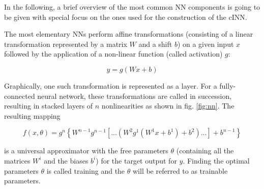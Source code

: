 In the following, a brief overview of the most common NN components is going to be given with special focus on the ones used for the construction of the cINN.

The most elementary NNs perform affine transformations (consisting of a linear transformation represented by a matrix $W$ and a shift $b$) on a given input $x$ followed by the application of a non-linear function (called activation) $g$:

\begin{equation*}
	y = g(Wx+b)
\end{equation*}

Graphically, one such transformation is represented as a layer. For a fully-connected neural network, these transformations are called in succession, resulting in stacked layers of $n$ nonlinearities as shown in fig. \ref{fig:nn}. The resulting mapping

\begin{equation*}
	f(x, \theta) = g^n\left\{W^{n-1}g^{n-1}\left[ ... \left(W^2g^1(W^1x+b^1)+b^2\right)...\right]+b^{n-1}\right\}
\end{equation*}

is a universal approximator with the free parameters $\theta$ (containing all the matrices $W^i$ and the biases $b^i$) for the target output for $y$. Finding the optimal parameters $\theta$ is called training and the $\theta$ will be referred to as trainable parameters.

